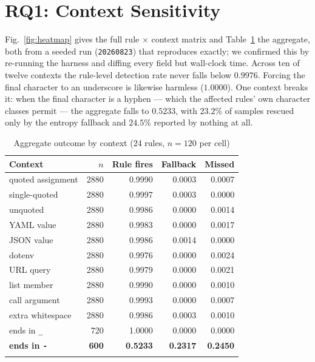 \documentclass[pdflatex,sn-basic]{sn-jnl}
\begin{document}
\section{RQ1: Context Sensitivity}
\label{sec:rq1}

Fig.~\ref{fig:heatmap} gives the full rule $\times$ context matrix and Table~\ref{tab:contexts} the aggregate, both from a seeded run (\texttt{20260823}) that reproduces exactly; we confirmed this by re-running the harness and diffing every field but wall-clock time. Across ten of twelve contexts the rule-level detection rate never falls below $0.9976$. Forcing the final character to an underscore is likewise harmless ($1.0000$). One context breaks it: when the final character is a hyphen --- which the affected rules' own character classes permit --- the aggregate falls to $\mathbf{0.5233}$, with $23.2\%$ of samples rescued only by the entropy fallback and $\mathbf{24.5\%}$ reported by nothing at all.

\begin{table}[t]
\centering
\caption{Aggregate outcome by context (24 rules, $n{=}120$ per cell)}
\label{tab:contexts}
\small
\begin{tabular}{@{}lrrrr@{}}
\toprule
Context & $n$ & Rule fires & Fallback & Missed \\
\midrule
quoted assignment & 2880 & 0.9990 & 0.0003 & 0.0007 \\
single-quoted & 2880 & 0.9997 & 0.0003 & 0.0000 \\
unquoted & 2880 & 0.9986 & 0.0000 & 0.0014 \\
YAML value & 2880 & 0.9983 & 0.0000 & 0.0017 \\
JSON value & 2880 & 0.9986 & 0.0014 & 0.0000 \\
dotenv & 2880 & 0.9976 & 0.0000 & 0.0024 \\
URL query & 2880 & 0.9979 & 0.0000 & 0.0021 \\
list member & 2880 & 0.9990 & 0.0000 & 0.0010 \\
call argument & 2880 & 0.9993 & 0.0000 & 0.0007 \\
extra whitespace & 2880 & 0.9986 & 0.0003 & 0.0010 \\
ends in \texttt{\_} & 720 & 1.0000 & 0.0000 & 0.0000 \\
\textbf{ends in \texttt{-}} & \textbf{600} & \textbf{0.5233} & \textbf{0.2317} & \textbf{0.2450} \\
\botrule
\end{tabular}
\end{table}
\end{document}
